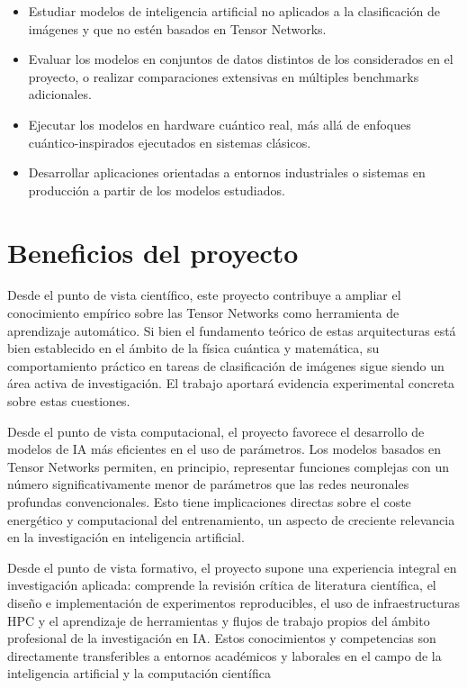 \documentclass[11pt,a4paper]{report}
\begin{document}
\begin{itemize}

	\item Estudiar modelos de inteligencia artificial no aplicados a la clasificación de imágenes y que no estén basados en Tensor Networks.

	\item Evaluar los modelos en conjuntos de datos distintos de los considerados en el proyecto, o realizar comparaciones extensivas en múltiples benchmarks adicionales.

	\item Ejecutar los modelos en hardware cuántico real, más allá de enfoques cuántico-inspirados ejecutados en sistemas clásicos.

	\item Desarrollar aplicaciones orientadas a entornos industriales o sistemas en producción a partir de los modelos estudiados.
	
\end{itemize}

\section{Beneficios del proyecto}

Desde el punto de vista científico, este proyecto contribuye a ampliar el conocimiento empírico sobre las Tensor Networks como herramienta de aprendizaje automático. Si bien el fundamento teórico de estas arquitecturas está bien establecido en el ámbito de la física cuántica y matemática, su comportamiento práctico en tareas de clasificación de imágenes sigue siendo un área activa de investigación. El trabajo aportará evidencia experimental concreta sobre estas cuestiones.

Desde el punto de vista computacional, el proyecto favorece el desarrollo de modelos de IA más eficientes en el uso de parámetros. Los modelos basados en Tensor Networks permiten, en principio, representar funciones complejas con un número significativamente menor de parámetros que las redes neuronales profundas convencionales. Esto tiene implicaciones directas sobre el coste energético y computacional del entrenamiento, un aspecto de creciente relevancia en la investigación en inteligencia artificial.

Desde el punto de vista formativo, el proyecto supone una experiencia integral en investigación aplicada: comprende la revisión crítica de literatura científica, el diseño e implementación de experimentos reproducibles, el uso de infraestructuras HPC y el aprendizaje de herramientas y flujos de trabajo propios del ámbito profesional de la investigación en IA. Estos conocimientos y competencias son directamente transferibles a entornos académicos y laborales en el campo de la inteligencia artificial y la computación científica
\end{document}
